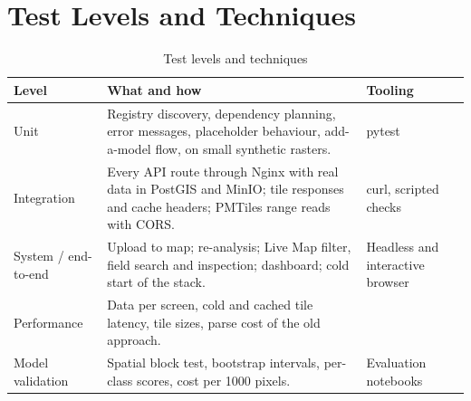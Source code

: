 \section{Test Levels and Techniques}
\begin{table}[htbp]
\centering\small
\caption{Test levels and techniques}
\label{tab:levels}
\begin{tabularx}{\textwidth}{L{2.8cm} Y L{3.0cm}}
\toprule
\textbf{Level} & \textbf{What and how} & \textbf{Tooling}\\
\midrule
Unit & Registry discovery, dependency planning, error messages, placeholder behaviour, add-a-model flow, on small synthetic rasters. & pytest\\
Integration & Every API route through Nginx with real data in PostGIS and MinIO; tile responses and cache headers; PMTiles range reads with CORS. & curl, scripted checks\\
System / end-to-end & Upload to map; re-analysis; Live Map filter, field search and inspection; dashboard; cold start of the stack. & Headless and interactive browser\\
Performance & Data per screen, cold and cached tile latency, tile sizes, parse cost of the old approach. & \\
Model validation & Spatial block test, bootstrap intervals, per-class scores, cost per 1000 pixels. & Evaluation notebooks\\
\bottomrule
\end{tabularx}
\end{table}

